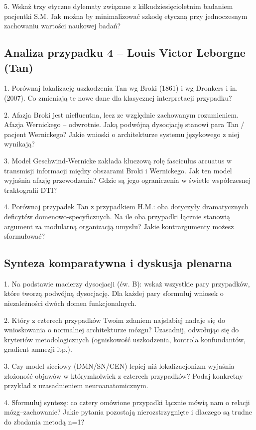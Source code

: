 \documentclass[11pt,a4paper]{article}
\begin{document}
5. Wskaż trzy etyczne dylematy związane z kilkudziesięcioletnim
badaniem pacjentki S.M. Jak można by minimalizować szkodę
etyczną przy jednoczesnym zachowaniu wartości naukowej
badań?

\subsection{Analiza przypadku 4 – Louis Victor Leborgne (Tan)}

1. Porównaj lokalizację uszkodzenia Tan wg Broki (1861) i wg Dronkers i in. (2007). Co zmieniają te nowe dane dla klasycznej interpretacji przypadku?

2. Afazja Broki jest niefluentna, lecz ze względnie zachowanym rozumieniem. Afazja Wernickego – odwrotnie. Jaką podwójną dysocjację stanowi para Tan / pacjent Wernickego? Jakie wnioski o architekturze systemu językowego z niej wynikają?



3. Model Geschwind-Wernicke zakłada kluczową rolę fasciculus arcuatus w transmisji informacji między obszarami Broki i Wernickego. Jak ten model wyjaśnia afazję przewodzenia? Gdzie są jego ograniczenia w świetle współczesnej traktografii DTI?

4. Porównaj przypadek Tan z przypadkiem H.M.: oba dotyczyły dramatycznych deficytów domenowo-specyficznych. Na ile oba przypadki łącznie stanowią argument za modularną organizacją umysłu? Jakie kontrargumenty możesz sformułować?

\subsection{Synteza komparatywna i dyskusja plenarna}

1. Na podstawie macierzy dysocjacji (ćw. B): wskaż wszystkie pary przypadków, które tworzą podwójną dysocjację. Dla każdej pary sformułuj wniosek o niezależności dwóch domen funkcjonalnych.

2. Który z czterech przypadków Twoim zdaniem najsłabiej nadaje się do wnioskowania o normalnej architekturze mózgu? Uzasadnij, odwołując się do kryteriów metodologicznych (ogniskowość uszkodzenia, kontrola konfundantów, gradient amnezji itp.).

3. Czy model sieciowy (DMN/SN/CEN) lepiej niż lokalizacjonizm wyjaśnia złożoność objawów w którymkolwiek z czterech przypadków? Podaj konkretny przykład z uzasadnieniem neuroanatomicznym.

4. Sformułuj syntezę: co cztery omówione przypadki łącznie mówią nam o relacji mózg–zachowanie? Jakie pytania pozostają nierozstrzygnięte i dlaczego są trudne do zbadania metodą n=1?
\end{document}
